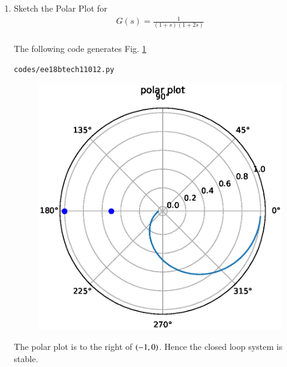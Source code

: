 \begin{enumerate}[label=\thesubsection.\arabic*.,ref=\thesubsection.\theenumi]
\item
Sketch the Polar Plot for
\begin{align}
G(s) = \frac{1}{(1+s)(1+2s)}
\end{align}
\\
\solution  The following code generates Fig.     \ref{fig:ee18btech11012}

%
\begin{lstlisting}
codes/ee18btech11012.py
\end{lstlisting}
%
\begin{figure}
    \centering
    \includegraphics[width=\columnwidth]{./figs/ee18btech11012.eps}
    \caption{}
    \label{fig:ee18btech11012}
\end{figure}
%
The polar plot is to the right of $\left(-1,0\right)$.  Hence the closed loop system is stable.
%
\end{enumerate}
